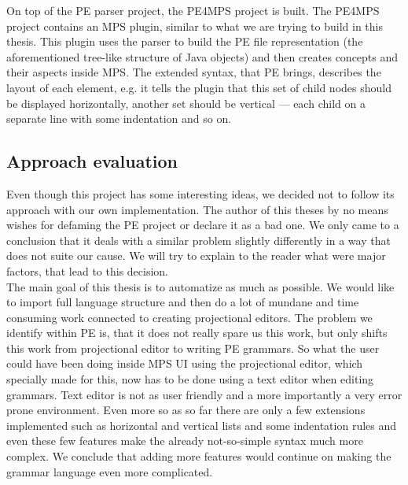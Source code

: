 On top of the PE parser project, the PE4MPS project is built. The PE4MPS project contains an MPS plugin, similar to what we are trying to build in this thesis. This plugin uses the parser to build the PE file representation (the aforementioned tree-like structure of Java objects) and then creates concepts and their aspects inside MPS. The extended syntax, that PE brings, describes the layout of each element, e.g. it tells the plugin that this set of child nodes should be displayed horizontally, another set should be vertical --- each child on a separate line with some indentation and so on.

\subsection{Approach evaluation}
Even though this project has some interesting ideas, we decided not to follow its approach with our own implementation. The author of this theses by no means wishes for defaming the PE project or declare it as a bad one. We only came to a conclusion that it deals with a similar problem slightly differently in a way that does not suite our cause. We will try to explain to the reader what were major factors, that lead to this decision.
\\

The main goal of this thesis is to automatize as much as possible. We would like to import full language structure and then do a lot of mundane and time consuming work connected to creating projectional editors. The problem we identify within PE is, that it does not really spare us this work, but only shifts this work from projectional editor to writing PE grammars. So what the user could have been doing inside MPS UI using the projectional editor, which specially made for this, now has to be done using a text editor when editing grammars. Text editor is not as user friendly and a more importantly a very error prone environment. Even more so as so far there are only a few extensions implemented such as horizontal and vertical lists and some indentation rules and even these few features make the already not-so-simple syntax much more complex. We conclude that adding more features would continue on making the grammar language even more complicated.
\\

